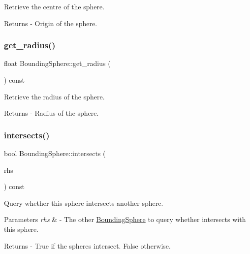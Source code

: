 Retrieve the centre of the sphere. \begin{DoxyReturn}{Returns}
-\/ Origin of the sphere. 
\end{DoxyReturn}
\mbox{\label{class_bounding_sphere_a5049afba6967afbd35f3e18d82a51acd}} 
\subsubsection{\texorpdfstring{get\+\_\+radius()}{get\_radius()}}
{\footnotesize\ttfamily float Bounding\+Sphere\+::get\+\_\+radius (\begin{DoxyParamCaption}{ }\end{DoxyParamCaption}) const}

Retrieve the radius of the sphere. \begin{DoxyReturn}{Returns}
-\/ Radius of the sphere. 
\end{DoxyReturn}
\mbox{\label{class_bounding_sphere_aea072dbeaec73a4738dd7adf496a11ae}} 
\subsubsection{\texorpdfstring{intersects()}{intersects()}\hspace{0.1cm}{\footnotesize\ttfamily [1/2]}}
{\footnotesize\ttfamily bool Bounding\+Sphere\+::intersects (\begin{DoxyParamCaption}\item[{const \mbox{\hyperlink{class_bounding_sphere}{Bounding\+Sphere}} \&}]{rhs }\end{DoxyParamCaption}) const}

Query whether this sphere intersects another sphere. 
\begin{DoxyParams}{Parameters}
{\em rhs} & -\/ The other \mbox{\hyperlink{class_bounding_sphere}{Bounding\+Sphere}} to query whether intersects with this sphere. \\
\hline
\end{DoxyParams}
\begin{DoxyReturn}{Returns}
-\/ True if the spheres intersect. False otherwise. 
\end{DoxyReturn}
\mbox{\label{class_bounding_sphere_aab64d759fac6a9835ac24d6fca8530d6}} 
